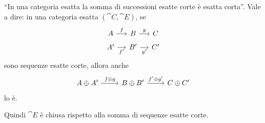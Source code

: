 \begin{proposition}\label{proposition:SumExactSeqsIsExact}
  ``In una categoria esatta la somma di successioni esatte corte è
  esatta corta''. Vale a dire: in una categoria esatta
  \((\cat C,\cat E)\), se
  \[
    \begin{tikzcd}[row sep=tiny, column sep=small]
      A \ar["{f}", r] & B \ar["{g}", r] & C \\
      A' \ar["{f'}", r, swap] & B' \ar["{g'}", r, swap] & C'
    \end{tikzcd}
  \]
  sono sequenze esatte corte, allora anche
  \begin{equation}
    \label{cd:SumExactSeqs}
    \begin{tikzcd}[row sep=small]
      A \oplus A' \ar["{f \oplus g}", r] & B \oplus B' \ar["{f' \oplus
        g'}", r] & C \oplus C'
    \end{tikzcd}
  \end{equation}
  lo è.
\end{proposition}

Quindi \(\cat E\) è chiusa rispetto alla somma di sequenze esatte corte.

